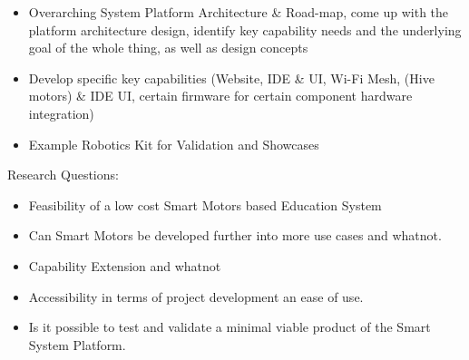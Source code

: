 \begin{itemize}
    \item Overarching System Platform Architecture \& Road-map, come up with the platform architecture design, identify key capability needs and the underlying goal of the whole thing, as well as design concepts
    \item Develop specific key capabilities (Website, IDE \& UI, Wi-Fi Mesh, (Hive motors) \& IDE UI, certain firmware for certain component hardware integration)
    \item Example Robotics Kit for Validation and Showcases
\end{itemize}



Research Questions:
\begin{itemize}
    \item Feasibility of a low cost Smart Motors based Education System
    \item Can Smart Motors be developed further into more use cases and whatnot.
    \item Capability Extension and whatnot
    \item Accessibility in terms of project development an ease of use.
    \item Is it possible to test and validate a minimal viable product of the Smart System Platform.
\end{itemize}

